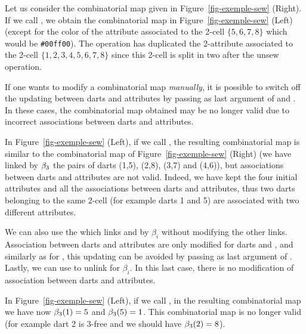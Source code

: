 Let us consider the combinatorial map given in
Figure~\ref{fig-exemple-sew} (Right). If we call , we
obtain the combinatorial map in Figure~\ref{fig-exemple-sew} (Left)
(except for the color of the attribute associated to the
2-cell $\{5,6,7,8\}$ which would be \texttt{\#00ff00}).  The 
operation has duplicated the 2-attribute associated to the 2-cell
$\{1,2,3,4,5,6,7,8\}$ since this 2-cell is split in two after the
unsew operation.

\begin{ccAdvanced}
  If one wants to modify a combinatorial map \emph{manually}, it is 
  possible to switch off the updating between
  darts and attributes by passing  as last argument of
   and
  .  In these cases, the
  combinatorial map obtained may be no longer valid due to incorrect
  associations between darts and attributes.
  
  In Figure~\ref{fig-exemple-sew} (Left), if we call
  , the resulting combinatorial map is similar
  to the combinatorial map of Figure~\ref{fig-exemple-sew} (Right)
  (we have linked by $\beta_{3}$ the pairs of darts (1,5), (2,8),
  (3,7) and (4,6)), but associations between darts and attributes
  are not valid. Indeed, we have kept the four initial attributes
  and all the associations between darts and attributes, thus two
  darts belonging to the same 2-cell (for example darts 1 and 5) are
  associated with two different attributes.

  We can also use the
   which links
   and  by $\beta_i$ without modifying the other
  links.
  Association between darts and attributes are only modified for darts
   and , and similarly as for , this
  updating can be avoided by passing  as last argument of
  .  Lastly, we can use
   to unlink  for $\beta_i$. In this
  last case, there is no modification of association between darts and
  attributes.

  In Figure~\ref{fig-exemple-sew} (Left), if we call
  , in the resulting combinatorial map we have
  now $\beta_{3}(1)=5$ and $\beta_{3}(5)=1$. This combinatorial map is no
  longer valid (for example dart 2 is 3-free and we should have
  $\beta_{3}(2)=8$).

\end{ccAdvanced}

